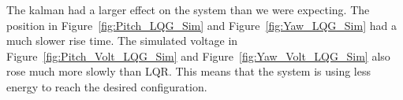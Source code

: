 The kalman had a larger effect on the system than we were expecting.  The position in Figure~\ref{fig:Pitch_LQG_Sim} and  Figure~\ref{fig:Yaw_LQG_Sim} had a much slower rise time.  The simulated voltage in  Figure~\ref{fig:Pitch_Volt_LQG_Sim} and  Figure~\ref{fig:Yaw_Volt_LQG_Sim} also rose much more slowly than LQR.  This means that the system is using less energy to reach the desired configuration. 





